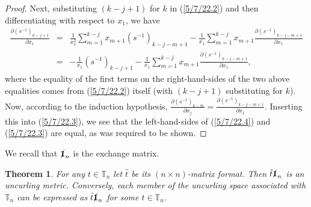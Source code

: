 \documentclass{amsart}
\numberwithin{equation}{section}
\newtheorem{theorem}{Theorem}
\theoremstyle{definition}
\numberwithin{theorem}{section}
\begin{document}
\begin{proof}
Next, substituting $(k-j+1)$ for $k$ in (\ref{5/7/22.2}) and then differentiating with respect to $x_1$, we have   \begin{eqnarray} \nonumber
 \frac{\partial \left( s^{-1} \right)_{k-j+1}}{\partial x_1} &=& \frac{1}{x_1^2} \sum_{m=1}^{k-j} x_{m+1} \left( s^{-1} \right)_{k-j-m+1}    - \frac{1}{x_1} \sum_{m=1}^{k-j} x_{m+1} \frac{\partial \left( s^{-1} \right)_{k-j-m+1}}{\partial x_1}  \\ &=& - \frac{1}{x_1}\left( s^{-1} \right)_{k-j+1}  -  \frac{1}{x_1} \sum_{m=1}^{k-j} x_{m+1} \frac{\partial \left( s^{-1} \right)_{k-j-m+1}}{\partial x_1},\label{5/7/22.3}\end{eqnarray} where the equality of the first terms on the right-hand-sides of the two above equalities comes from (\ref{5/7/22.2}) itself (with $(k-j+1)$ substituting for $k$). 
 Now, according to the induction hypothesis, $\frac{\partial \left( s^{-1} \right)_{k-m}}{\partial x_j} = \frac{\partial \left( s^{-1} \right)_{k-j-m+1}}{\partial x_1}$.  Inserting this into (\ref{5/7/22.3}), we see that the left-hand-sides of (\ref{5/7/22.4}) and (\ref{5/7/22.3}) are equal, as was required to be shown.
 \end{proof} 

We recall that $\slashed{\bf 1}_n$ is the exchange matrix.

\begin{theorem} \label{5/4/22.2} For any $t\in \mathbb{T}_n$ let $\hat{t}$ be its $(n\times n)$-matrix format.    Then $\hat{t} \slashed{\bf 1}_n$ is an uncurling metric.  Conversely, each member of the uncurling space associated with $\mathbb{T}_n$ can be expressed as $\hat{t}\slashed{\bf 1}_n$ for some $t\in \mathbb{T}_n$.   \end{theorem}
\end{document}
